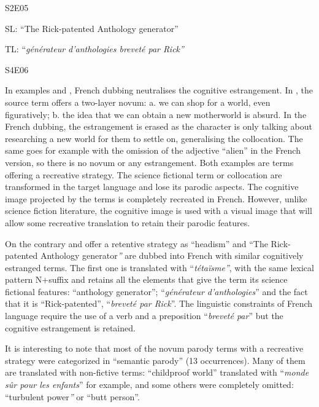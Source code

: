 \documentclass[output=paper]{langscibook}
\begin{document}
S2E05
\z

\ea\label{ex:ray:4}
SL: “The Rick-patented Anthology generator”


TL: “\textit{générateur d’anthologies breveté par Rick”}

S4E06
\z

In examples  and , French dubbing neutralises the cognitive estrangement. In , the source term offers a two-layer novum: a. we can shop for a world, even figuratively; b. the idea that we can obtain a new motherworld is absurd. In the French dubbing, the estrangement is erased as the character is only talking about researching a new world for them to settle on, generalising the collocation. The same goes for example  with the omission of the adjective “alien” in the French version, so there is no novum or any estrangement. Both examples are terms offering a recreative strategy. The science fictional term or collocation are transformed in the target language and lose its parodic aspects. The cognitive image projected by the terms is completely recreated in French. However, unlike science fiction literature, the cognitive image is used with a visual image that will allow some recreative translation to retain their parodic features.

On the contrary  and  offer a retentive strategy as “headism” and “The Rick-patented Anthology generator\textit{”} are dubbed into French with similar cognitively estranged terms. The first one is translated with “\textit{tétaïsme”}, with the same lexical pattern N+suffix and  retains all the elements that give the term its science fictional features: “anthology generator”; “\textit{générateur d’anthologies}” and the fact that it is “Rick-patented”, “\textit{breveté par Rick}”. The linguistic constraints of French language require the use of a verb and a preposition “\textit{breveté par}” but the cognitive estrangement is retained.

It is interesting to note that most of the novum parody terms with a recreative strategy were categorized in “semantic parody” (13 occurrences). Many of them are translated with non-fictive terms: “childproof world” translated with “\textit{monde sûr pour les enfants}” for example, and some others were completely omitted: “turbulent power\textit{”} or “butt person”.
\end{document}
